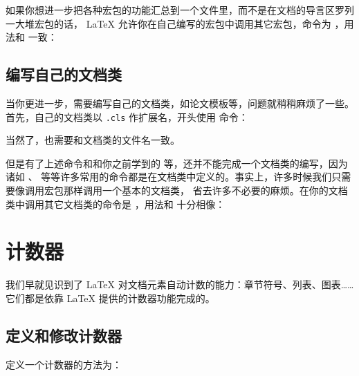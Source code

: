 如果你想进一步把各种宏包的功能汇总到一个文件里，而不是在文档的导言区罗列一大堆宏包的话，
\LaTeX{} 允许你在自己编写的宏包中调用其它宏包，命令为 ，用法和 
一致：
\begin{command}
\end{command}

\subsection{编写自己的文档类}\label{subsec:provide-cls}

当你更进一步，需要编写自己的文档类，如论文模板等，问题就稍稍麻烦了一些。首先，自己的文档类以 \texttt{.cls} 作扩展名，开头使用
 命令：
\begin{command}
\end{command}
当然了，也需要和文档类的文件名一致。

但是有了上述命令和和你之前学到的  等，还并不能完成一个文档类的编写，因为诸如 、
 等等许多常用的命令都是在文档类中定义的。事实上，许多时候我们只需要像调用宏包那样调用一个基本的文档类，
省去许多不必要的麻烦。在你的文档类中调用其它文档类的命令是  ，用法和  十分相像：
\begin{command}
\end{command}

\section{计数器}\label{sec:counters}

我们早就见识到了 \LaTeX{} 对文档元素自动计数的能力：章节符号、列表、图表……它们都是依靠 \LaTeX{} 提供的计数器功能完成的。

\subsection{定义和修改计数器}\label{subsec:count-defs}

定义一个计数器的方法为：
\begin{command}
\end{command}

